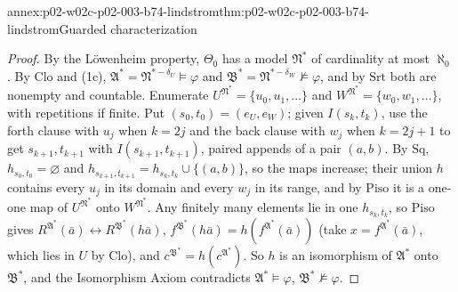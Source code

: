 \begin{annexitem}{annex:p02-w02c-p02-003-b74-lindstrom}{thm:p02-w02c-p02-003-b74-lindstrom}{Guarded characterization}
\begin{proof}
By the L\"owenheim property, \(\Theta_0\) has a model \(\mathfrak N^{\ast}\)
of cardinality at most \(\aleph_0\).  By \(\mathrm{Clo}\) and (1c),
\(\mathfrak A^{\ast}=\mathfrak N^{\ast-\delta_U}\models\varphi\) and
\(\mathfrak B^{\ast}=\mathfrak N^{\ast-\delta_W}\not\models\varphi\), and by
\(\mathrm{Srt}\) both are nonempty and countable.  Enumerate
\(U^{\mathfrak N^{\ast}}=\{u_0,u_1,\ldots\}\) and
\(W^{\mathfrak N^{\ast}}=\{w_0,w_1,\ldots\}\), with repetitions if finite.
Put \((s_0,t_0)=(e_U,e_W)\); given \(I(s_k,t_k)\), use the forth clause
with \(u_j\) when \(k=2j\) and the back clause with \(w_j\) when
\(k=2j+1\) to get \(s_{k+1},t_{k+1}\) with \(I(s_{k+1},t_{k+1})\), paired
appends of a pair \((a,b)\).  By \(\mathrm{Sq}\), \(h_{s_0,t_0}=\varnothing\)
and \(h_{s_{k+1},t_{k+1}}=h_{s_k,t_k}\cup\{(a,b)\}\), so the maps increase;
their union \(h\) contains every \(u_j\) in its domain and every \(w_j\) in
its range, and by \(\mathrm{Piso}\) it is a one-one map of
\(U^{\mathfrak N^{\ast}}\) onto \(W^{\mathfrak N^{\ast}}\).  Any finitely
many elements lie in one \(h_{s_k,t_k}\), so \(\mathrm{Piso}\) gives
\(R^{\mathfrak A^{\ast}}(\bar a)\leftrightarrow R^{\mathfrak B^{\ast}}(h\bar a)\),
\(f^{\mathfrak B^{\ast}}(h\bar a)=h(f^{\mathfrak A^{\ast}}(\bar a))\) (take
\(x=f^{\mathfrak A^{\ast}}(\bar a)\), which lies in \(U\) by
\(\mathrm{Clo}\)), and \(c^{\mathfrak B^{\ast}}=h(c^{\mathfrak A^{\ast}})\).
So \(h\) is an isomorphism of \(\mathfrak A^{\ast}\) onto \(\mathfrak
B^{\ast}\), and the Isomorphism Axiom contradicts \(\mathfrak
A^{\ast}\models\varphi\), \(\mathfrak B^{\ast}\not\models\varphi\).


\end{proof}
\end{annexitem}
